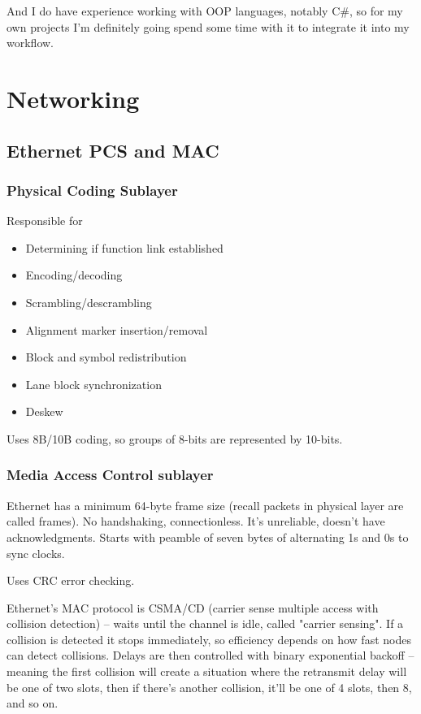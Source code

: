 \documentclass{IEEEtran}
\begin{document}
And I do have experience working with OOP languages, notably C\#, so for my own projects I'm definitely going spend some time with it to integrate it into my workflow.

\section{Networking}

\subsection{Ethernet PCS and MAC}

\subsubsection{Physical Coding Sublayer} Responsible for 
\begin{itemize}
\item Determining if function link established
\item Encoding/decoding 
\item Scrambling/descrambling
\item Alignment marker insertion/removal
\item Block and symbol redistribution
\item Lane block synchronization
\item Deskew
\end{itemize}

Uses 8B/10B coding, so groups of 8-bits are represented by 10-bits.

\subsubsection{Media Access Control sublayer} Ethernet has a minimum 64-byte frame size (recall packets in physical layer are called frames). No handshaking, connectionless. It's unreliable, doesn't have acknowledgments. Starts with peamble of seven bytes of alternating 1s and 0s to sync clocks.

Uses CRC error checking.  

Ethernet's MAC protocol is CSMA/CD (carrier sense multiple access with collision detection) -- waits until the channel is idle, called "carrier sensing". If a collision is detected it stops immediately, so efficiency depends on how fast nodes can detect collisions. Delays are then controlled with binary exponential backoff -- meaning the first collision will create a situation where the retransmit delay will be one of two slots, then if there's another collision, it'll be one of 4 slots, then 8, and so on.
\end{document}
